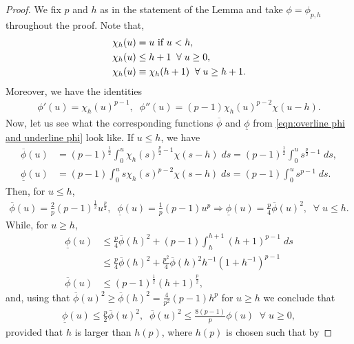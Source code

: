\documentclass[12pt,american]{amsart}
\numberwithin{equation}{section}
\theoremstyle{plain}
\theoremstyle{definition}                  %
\begin{document}
  \begin{proof}
    We fix $p$ and $h$ as in the statement of the Lemma and take $\phi = \phi_{p,h}$ throughout the proof. Note that,
    \begin{align*}
      & \chi_h(u) = u \textnormal{ if } u<h,\\
      & \chi_h(u) \leq h+1 \;\;\forall\;u \geq 0,\\
      &\chi_h(u) \equiv \chi_h(h+1)\;\; \forall\;u\geq h+1.		
    \end{align*}
    Moreover, we have the identities
  \begin{align*}
    \phi'(u) = \chi_h(u)^{p-1},\;\;\phi''(u) = (p-1)\chi_h(u)^{p-2}\chi(u-h).
  \end{align*}
  Now, let us see what the corresponding functions $\overline{\phi}$ and $\underline{\phi}$ from \eqref{eqn:overline phi and underline phi} look like. If $u\leq h$, we have
  \begin{align*}
    \overline{\phi}(u) & = (p-1)^{\frac{1}{2}}\int_{0}^u \chi_h(s)^{\frac{p}{2}-1}\chi(s-h)\;ds  = (p-1)^{\frac{1}{2}}\int_{0}^u s^{\frac{p}{2}-1}\;ds,\\	
    \underline{\phi}(u) & = (p-1)\int_{0}^u s \chi_h(s)^{p-2}\chi(s-h)\;ds = (p-1)\int_{0}^u s^{p-1}\;ds.	
  \end{align*}	
  Then, for $u\leq h$,
  \begin{align*}
    \overline{\phi}(u) = \tfrac{2}{p}(p-1)^{\frac{1}{2}}u^{\frac{p}{2}},\;\; \underline{\phi}(u) = \tfrac{1}{p}(p-1)u^p \Rightarrow \underline{\phi}(u) = \frac{p}{4}\overline{\phi}(u)^2,\;\;\forall\;u\leq h.	
  \end{align*}	
  While, for $u\geq h$,
  \begin{align*}
    \underline{\phi}(u) & \leq \tfrac{p}{4}\overline{\phi}(h)^2+ (p-1)\int_h^{h+1}(h+1)^{p-1}\;ds\\
      & \leq \tfrac{p}{4}\overline{\phi}(h)^2+ \frac{p^2}{4} \overline{\phi}(h)^2h^{-1} (1+h^{-1})^{p-1}\\	
    \overline{\phi}(u) & \leq (p-1)^{\frac{1}{2}}(h+1)^{\frac{p}{2}},
  \end{align*}
  and, using that $\overline{\phi}(u)^2 \geq \overline{\phi}(h)^2 = \tfrac{4}{p^2}(p-1)h^p$ for $u\geq h$ we conclude that
  \begin{align*}
    \underline{\phi}(u) \leq \frac{p}{2}\overline{\phi}(u)^2,\;\; \overline{\phi}(u)^2 \leq \frac{8(p-1)}{p} \phi(u)\;\;\forall\;u\geq 0,
  \end{align*}
  provided that $h$ is larger than $h(p)$, where $h(p)$ is chosen such that by

\end{proof}
\end{document}
